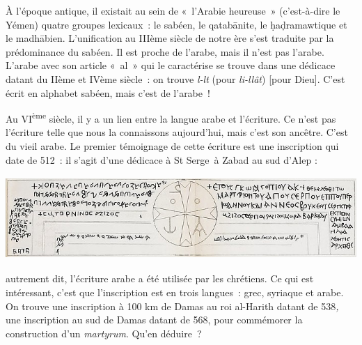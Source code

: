 À l'époque antique, il existait au sein de «~l'Arabie heureuse~»
(c'est-à-dire le Yémen) quatre groupes lexicaux~: le sabéen, le
qatabānite, le ḥaḍramawtique et le madhābien. L'unification au IIIème
siècle de notre ère s'est traduite par la prédominance du sabéen. Il est
proche de l'arabe, mais il n'est pas l'arabe. L'arabe avec son article
«~al~» qui le caractérise se trouve dans une dédicace datant du IIème et
IVème siècle~: on trouve \emph{l-lt} (pour \emph{li-llât}) {[}pour
Dieu{]}. C'est écrit en alphabet sabéen, mais c'est de l'arabe~!

Au VI\textsuperscript{ème} siècle, il y a un lien entre la langue arabe
et l'écriture. Ce n'est pas l'écriture telle que nous la connaissons
aujourd'hui, mais c'est son ancêtre. C'est du vieil arabe. Le premier
témoignage de cette écriture est une inscription qui date de 512~: il
s'agit d'une dédicace à St Serge~à Zabad au sud d'Alep :

\includegraphics[width=5.51181in,height=1.23542in]{Images/image029.jpg}

autrement dit, l'écriture arabe a été utilisée par les chrétiens. Ce qui
est intéressant, c'est que l'inscription est en trois langues~: grec,
syriaque et arabe. On trouve une inscription à 100 km de Damas au roi
al-Harith datant de 538\emph{,} une inscription au sud de Damas datant
de 568, pour commémorer la construction d'un \emph{martyrum}. Qu'en
déduire~?

